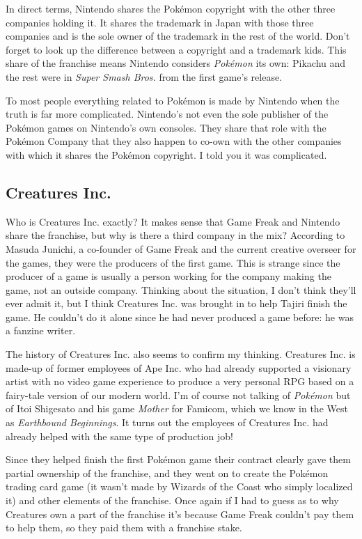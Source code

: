 \documentclass{book}
\begin{document}
In direct terms, Nintendo shares the Pokémon copyright with the other three companies holding it. It shares the trademark in Japan with those three companies and is the sole owner of the trademark in the rest of the world. Don’t forget to look up the difference between a copyright and a trademark kids. This share of the franchise means Nintendo considers \emph{Pokémon} its own: Pikachu and the rest were in \emph{Super Smash Bros.} from the first game’s release.

To most people everything related to Pokémon is made by Nintendo when the truth is far more complicated. Nintendo’s not even the sole publisher of the Pokémon games on Nintendo’s own consoles. They share that role with the Pokémon Company that they also happen to co-own with the other companies with which it shares the Pokémon copyright. I told you it was complicated.

\subsection*{Creatures Inc.}\nopagebreak[4]

Who is Creatures Inc. exactly? It makes sense that Game Freak and Nintendo share the franchise, but why is there a third company in the mix? According to Masuda Junichi, a co-founder of Game Freak and the current creative overseer for the games, they were the producers of the first game. This is strange since the producer of a game is usually a person working for the company making the game, not an outside company. Thinking about the situation, I don’t think they’ll ever admit it, but I think Creatures Inc. was brought in to help Tajiri finish the game. He couldn’t do it alone since he had never produced a game before: he was a fanzine writer.

The history of Creatures Inc. also seems to confirm my thinking. Creatures Inc. is made-up of former employees of Ape Inc. who had already supported a visionary artist with no video game experience to produce a very personal RPG based on a fairy-tale version of our modern world. I’m of course not talking of \emph{Pokémon} but of Itoi Shigesato and his game \emph{Mother} for Famicom, which we know in the West as \emph{Earthbound Beginnings}. It turns out the employees of Creatures Inc. had already helped with the same type of production job!

Since they helped finish the first Pokémon game their contract clearly gave them partial ownership of the franchise, and they went on to create the Pokémon trading card game (it wasn’t made by Wizards of the Coast who simply localized it) and other elements of the franchise. Once again if I had to guess as to why Creatures own a part of the franchise it’s because Game Freak couldn’t pay them to help them, so they paid them with a franchise stake.
\end{document}
